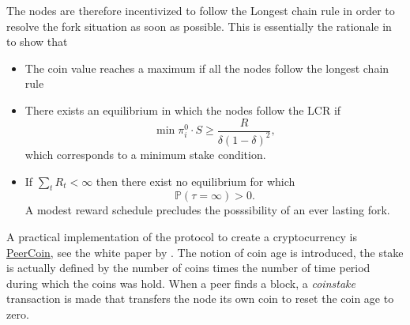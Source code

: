 \noindent The nodes are therefore incentivized to follow the Longest chain rule in order to resolve the fork situation as soon as possible. This is essentially the rationale in \citet{Saleh2020} to show that 
\begin{itemize}
    \item The coin value reaches a maximum if all the nodes follow the longest chain rule
    \item There exists an equilibrium in which the nodes follow the LCR if 
    $$
    \min \pi_i^0 \cdot S\geq\frac{R}{\delta(1-\delta)^2},
    $$
    which corresponds to a minimum stake condition.
    \item If $\sum_t R_t < \infty$ then there exist no equilibrium for which 
    $$
    \mathbb{P}(\tau=\infty)>0.
    $$
    A modest reward schedule precludes the posssibility of an ever lasting fork. 
\end{itemize}
A practical implementation of the \PoS protocol to create a cryptocurrency is \href{https://www.peercoin.net/}{PeerCoin}, see the white paper by \citet{ppcoin}. The notion of coin age is introduced, the stake is actually defined by the number of coins times the number of time period during which the coins was hold. When a peer finds a block, a \textit{coinstake} transaction is made that transfers the node its own coin to reset the coin age to zero.  
